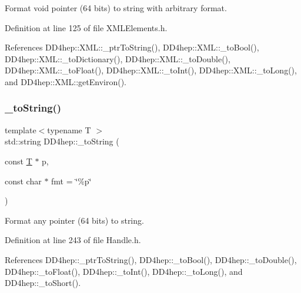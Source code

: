 Format void pointer (64 bits) to string with arbitrary format. 



Definition at line 125 of file X\+M\+L\+Elements.\+h.



References D\+D4hep\+::\+X\+M\+L\+::\+\_\+ptr\+To\+String(), D\+D4hep\+::\+X\+M\+L\+::\+\_\+to\+Bool(), D\+D4hep\+::\+X\+M\+L\+::\+\_\+to\+Dictionary(), D\+D4hep\+::\+X\+M\+L\+::\+\_\+to\+Double(), D\+D4hep\+::\+X\+M\+L\+::\+\_\+to\+Float(), D\+D4hep\+::\+X\+M\+L\+::\+\_\+to\+Int(), D\+D4hep\+::\+X\+M\+L\+::\+\_\+to\+Long(), and D\+D4hep\+::\+X\+M\+L\+::get\+Environ().

\hypertarget{group___d_d4_h_e_p___x_m_l_ga9f9a53baefc2d21a7276090d8b988d29}{}\label{group___d_d4_h_e_p___x_m_l_ga9f9a53baefc2d21a7276090d8b988d29} 
\subsubsection{\texorpdfstring{\+\_\+to\+String()}{\_toString()}\hspace{0.1cm}{\footnotesize\ttfamily [12/12]}}
{\footnotesize\ttfamily template$<$typename T $>$ \\
std\+::string D\+D4hep\+::\+\_\+to\+String (\begin{DoxyParamCaption}\item[{const \hyperlink{class_t}{T} $\ast$}]{p,  }\item[{const char $\ast$}]{fmt = {\ttfamily \char`\"{}\%p\char`\"{}} }\end{DoxyParamCaption})}



Format any pointer (64 bits) to string. 



Definition at line 243 of file Handle.\+h.



References D\+D4hep\+::\+\_\+ptr\+To\+String(), D\+D4hep\+::\+\_\+to\+Bool(), D\+D4hep\+::\+\_\+to\+Double(), D\+D4hep\+::\+\_\+to\+Float(), D\+D4hep\+::\+\_\+to\+Int(), D\+D4hep\+::\+\_\+to\+Long(), and D\+D4hep\+::\+\_\+to\+Short().

\hypertarget{group___d_d4_h_e_p___x_m_l_gad7c5e5c9ad994b97f08eec6e7829e23f}{}\label{group___d_d4_h_e_p___x_m_l_gad7c5e5c9ad994b97f08eec6e7829e23f} 
